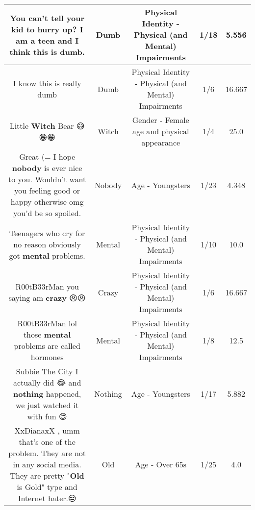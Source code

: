 \documentclass[11pt]{article}
\newlength\mylength
\begin{document}
\begin{center}
\begin{longtable}{|C{.65\mylength}|C{.30\mylength}|C{.12\mylength}|C{.12\mylength}|C{.12\mylength}|}
  \small You can't tell your kid to hurry up? I am a teen and I think this is \textbf{dumb}.\normalsize   & Dumb & Physical Identity - Physical (and Mental) Impairments & 1/18 & 5.556 \\  \hline
  \small I know this is really dumb\normalsize   & Dumb & Physical Identity - Physical (and Mental) Impairments & 1/6 & 16.667 \\  \hline
  \small Little \textbf{Witch} Bear 😅😁😁\normalsize   & Witch & Gender - Female age and physical appearance & 1/4 & 25.0 \\  \hline
  \small Great (= I hope \textbf{nobody} is ever nice to you. Wouldn't want you feeling good or happy otherwise omg you'd be so spoiled.\normalsize   & Nobody & Age - Youngsters & 1/23 & 4.348 \\  \hline
  \small Teenagers who cry for no reason obviously got \textbf{mental} problems.\normalsize   & Mental & Physical Identity - Physical (and Mental) Impairments & 1/10 & 10.0 \\  \hline
  \small R00tB33rMan you saying am \textbf{crazy} 😠😠\normalsize   & Crazy & Physical Identity - Physical (and Mental) Impairments & 1/6 & 16.667 \\  \hline
  \small R00tB33rMan lol those \textbf{mental} problems are called hormones\normalsize   & Mental & Physical Identity - Physical (and Mental) Impairments & 1/8 & 12.5 \\  \hline
  \small Subbie The City I actually did 😂 and \textbf{nothing} happened, we just watched it with fun 😊\normalsize   & Nothing & Age - Youngsters & 1/17 & 5.882 \\  \hline
  \small XxDianaxX , umm that's one of the problem. They are not in any social media. They are pretty "\textbf{Old} is Gold" type and Internet hater.😑\normalsize   & Old & Age - Over 65s & 1/25 & 4.0 \\  \hline

\end{longtable}
\end{center}
\end{document}
